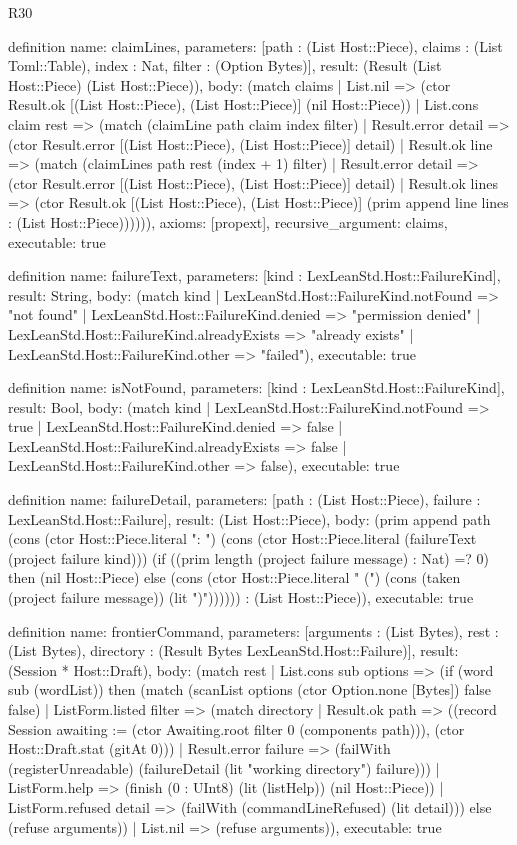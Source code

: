 \begin{lexlean}{R30}
\begin{semanticmodule}
definition{
  name: claimLines,
  parameters: [path : (List Host::Piece), claims : (List Toml::Table), index : Nat, filter : (Option Bytes)],
  result: (Result (List Host::Piece) (List Host::Piece)),
  body: (match claims
    | List.nil => (ctor Result.ok [(List Host::Piece), (List Host::Piece)] (nil Host::Piece))
    | List.cons claim rest => (match (claimLine path claim index filter)
      | Result.error detail => (ctor Result.error [(List Host::Piece), (List Host::Piece)] detail)
      | Result.ok line => (match (claimLines path rest (index + 1) filter)
        | Result.error detail => (ctor Result.error [(List Host::Piece), (List Host::Piece)] detail)
        | Result.ok lines => (ctor Result.ok [(List Host::Piece), (List Host::Piece)] (prim append line lines : (List Host::Piece)))))),
  axioms: [propext],
  recursive_argument: claims,
  executable: true
}

definition{
  name: failureText,
  parameters: [kind : LexLeanStd.Host::FailureKind],
  result: String,
  body: (match kind
    | LexLeanStd.Host::FailureKind.notFound => "not found"
    | LexLeanStd.Host::FailureKind.denied => "permission denied"
    | LexLeanStd.Host::FailureKind.alreadyExists => "already exists"
    | LexLeanStd.Host::FailureKind.other => "failed"),
  executable: true
}

definition{
  name: isNotFound,
  parameters: [kind : LexLeanStd.Host::FailureKind],
  result: Bool,
  body: (match kind
    | LexLeanStd.Host::FailureKind.notFound => true
    | LexLeanStd.Host::FailureKind.denied => false
    | LexLeanStd.Host::FailureKind.alreadyExists => false
    | LexLeanStd.Host::FailureKind.other => false),
  executable: true
}

definition{
  name: failureDetail,
  parameters: [path : (List Host::Piece), failure : LexLeanStd.Host::Failure],
  result: (List Host::Piece),
  body: (prim append path (cons (ctor Host::Piece.literal ": ") (cons (ctor Host::Piece.literal (failureText (project failure kind))) (if ((prim length (project failure message) : Nat) =? 0) then (nil Host::Piece) else (cons (ctor Host::Piece.literal " (") (cons (taken (project failure message)) (lit ")")))))) : (List Host::Piece)),
  executable: true
}

definition{
  name: frontierCommand,
  parameters: [arguments : (List Bytes), rest : (List Bytes), directory : (Result Bytes LexLeanStd.Host::Failure)],
  result: (Session * Host::Draft),
  body: (match rest
    | List.cons sub options => (if (word sub (wordList)) then (match (scanList options (ctor Option.none [Bytes]) false false)
      | ListForm.listed filter => (match directory | Result.ok path => ((record Session {awaiting := (ctor Awaiting.root filter 0 (components path))}), (ctor Host::Draft.stat (gitAt 0))) | Result.error failure => (failWith (registerUnreadable) (failureDetail (lit "working directory") failure)))
      | ListForm.help => (finish (0 : UInt8) (lit (listHelp)) (nil Host::Piece))
      | ListForm.refused detail => (failWith (commandLineRefused) (lit detail))) else (refuse arguments))
    | List.nil => (refuse arguments)),
  executable: true
}


\end{semanticmodule}
\end{lexlean}
